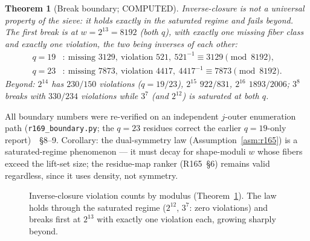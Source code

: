 \documentclass[11pt,a4paper]{article}
\newtheorem{theorem}{Theorem}
\theoremstyle{definition}
\begin{document}
\begin{theorem}[Break boundary; COMPUTED]
  \label{thm:boundary}
  Inverse-closure is not a universal property of the sieve: it holds
  exactly in the saturated regime and fails beyond. The first break is
  at $w=2^{13}=8192$ (both $q$), with exactly one missing fiber class
  and exactly one violation, the two being inverses of each other:
  \begin{equation}
    \label{eq:break}
    \begin{aligned}
      q=19&:\ \text{missing }3129,\ \text{violation }521,\
            521^{-1}\equiv3129\pmod{8192},\\
      q=23&:\ \text{missing }7873,\ \text{violation }4417,\
            4417^{-1}\equiv7873\pmod{8192}.
    \end{aligned}
  \end{equation}
  Beyond: $2^{14}$ has $230/150$ violations ($q=19/23$),
  $2^{15}$ $922/831$, $2^{16}$ $1893/2006$; $3^8$ breaks with $330/234$
  violations while $3^7$ (and $2^{12}$) is saturated at both $q$.
\end{theorem}
All boundary numbers were re-verified on an independent $j$-outer
enumeration path (\texttt{r169\_boundary.py}; the $q=23$ residues
correct the earlier $q=19$-only report)~\cite{R169}~\S8--9. Corollary:
the dual-symmetry law (Assumption~\ref{asm:r165}) is a saturated-regime
phenomenon --- it must decay for shape-moduli $w$ whose fibers exceed
the lift-set size; the residue-map ranker (R165~\S6) remains valid
regardless, since it uses density, not symmetry.

\begin{figure}[t]
  \centering
  \caption{Inverse-closure violation counts by modulus
    (Theorem~\ref{thm:boundary}). The law holds through the saturated
    regime ($2^{12}$, $3^7$: zero violations) and breaks first at
    $2^{13}$ with exactly one violation each, growing sharply beyond.}
  \label{fig:boundary}
\end{figure}
\end{document}
